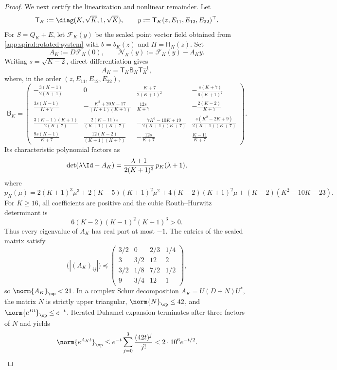 \begin{proof}
We next certify the linearization and nonlinear remainder.  Let
\begin{equation}
\label{app:spiral:y-scaling}
 \mathsf T_K:=\diag(K,\sqrt K,1,\sqrt K),
 \qquad
 y:=\mathsf T_K(z,E_{11},E_{12},E_{22})^\top.
\end{equation}
For \(S=Q_K+E\), let \(\mathcal F_K(y)\) be the scaled point vector field
obtained from \eqref{app:spiral:rotated-system} with
\(\bar b=b_K(z)\) and \(\bar H=\mathsf H_K(z)\).  Set
\[
 A_K:=D\mathcal F_K(0),
 \qquad
 \mathcal N_K(y):=\mathcal F_K(y)-A_Ky.
\]
Writing \(s=\sqrt{K-2}\), direct differentiation gives
\begin{equation}
\label{app:spiral:linear-matrix}
 A_K=\mathsf T_K\mathsf B_K\mathsf T_K^{-1},
\end{equation}
where, in the order \((z,E_{11},E_{12},E_{22})\),
{\scriptsize
\[
\mathsf B_K=
\begin{pmatrix}
-\frac{3(K-1)}{2(K+1)}&0&\frac{K+7}{2(K+1)^2}
&-\frac{s(K+7)}{6(K+1)^2}\\[1mm]
\frac{3s(K-1)}{K+7}
&-\frac{K^2+20K-17}{(K+1)(K+7)}
&\frac{12s}{K+7}&-\frac{2(K-2)}{K+7}\\[1mm]
\frac{3(K-1)(K+1)}{2(K+7)}
&\frac{2(K-11)s}{(K+1)(K+7)}
&-\frac{7K^2-10K+19}{2(K+1)(K+7)}
&\frac{s(K^2-2K+9)}{2(K+1)(K+7)}\\[1mm]
\frac{9s(K-1)}{K+7}
&\frac{12(K-2)}{(K+1)(K+7)}
&-\frac{12s}{K+7}&\frac{K-11}{K+7}
\end{pmatrix}.
\]
}
Its characteristic polynomial factors as
\begin{equation}
\label{app:spiral:characteristic-polynomial}
 \det(\lambda\Id-A_K)
 =\frac{\lambda+1}{2(K+1)^3}\,p_K(\lambda+1),
\end{equation}
where
\[
 p_K(\mu)
 =2(K+1)^3\mu^3
 +2(K-5)(K+1)^2\mu^2
 +4(K-2)(K+1)^2\mu
 +(K-2)(K^2-10K-23).
\]
For \(K\geq16\), all coefficients are positive and the cubic
Routh--Hurwitz determinant is
\[
 6(K-2)(K-1)^2(K+1)^3>0.
\]
Thus every eigenvalue of \(A_K\) has real part at most \(-1\).  The
entries of the scaled matrix satisfy
\[
 \bigl(|(A_K)_{ij}|\bigr)
 \preceq
 \begin{pmatrix}
 3/2&0&2/3&1/4\\
 3&3/2&12&2\\
 3/2&1/8&7/2&1/2\\
 9&3/4&12&1
 \end{pmatrix},
\]
so \(\norm{A_K}_{\op}<21\).  In a complex Schur decomposition
\(A_K=U(D+N)U^*\), the matrix \(N\) is strictly upper triangular,
\(\norm{N}_{\op}\leq42\), and
\(\norm{e^{Dt}}_{\op}\leq e^{-t}\).  Iterated Duhamel expansion
terminates after three factors of \(N\) and yields
\begin{equation}
\label{app:spiral:semigroup-bound}
 \norm{e^{A_Kt}}_{\op}
 \leq e^{-t}\sum_{j=0}^3\frac{(42t)^j}{j!}
 <2\cdot10^6e^{-t/2}.
\end{equation}


\end{proof}

